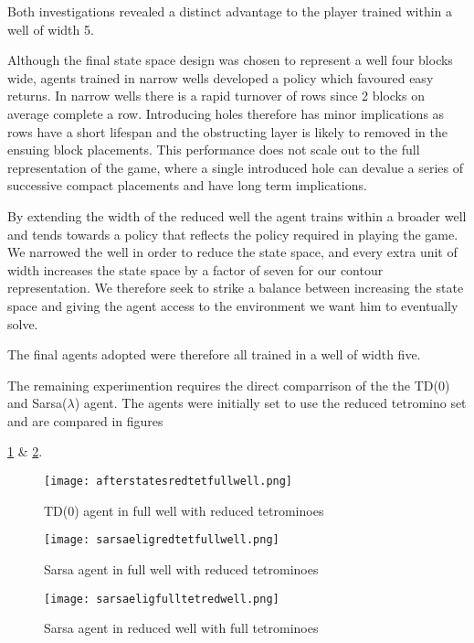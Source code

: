 \documentclass{rucsthesis}
\begin{document}
Both investigations revealed a distinct advantage to the player trained within a well of width 5.

Although the final state space design was chosen to represent a well four blocks wide, agents trained in narrow wells developed a policy which favoured easy returns. In narrow wells there is a rapid turnover of rows since 2 blocks on average complete a row. Introducing holes therefore has minor implications as rows have a short lifespan and the obstructing layer is likely to removed in the ensuing block placements. This performance does not scale out to the full representation of the game, where a single introduced hole can devalue a series of successive compact placements and have long term implications.

By extending the width of the reduced well the agent trains within a broader well and tends towards a policy that reflects the policy required in playing the game. We narrowed the well in order to reduce the state space, and every extra unit of width increases the state space by a factor of seven for our contour representation. We therefore seek to strike a balance between increasing the state space and giving the agent access to the environment we want him to eventually solve.

The final agents adopted were therefore all trained in a well of width five.

The remaining experimention requires the direct comparrison of the the TD(0) and Sarsa($\lambda$) agent. The agents were initially set to use the reduced tetromino set and are compared in figures

\ref{fig:afterstatesredtetfullwell} \& \ref{fig:sarsaeligredtetfullwell}.

\begin{figure}[h]
\centering
\texttt{[image: afterstatesredtetfullwell.png]}
\caption{TD(0) agent in full well with reduced tetrominoes}
\label{fig:afterstatesredtetfullwell}
\end{figure}

\begin{figure}[h]
\centering
\texttt{[image: sarsaeligredtetfullwell.png]}
\caption{Sarsa agent in full well with reduced tetrominoes}
\label{fig:sarsaeligredtetfullwell}
\end{figure}

\begin{figure}[h]
\centering
\texttt{[image: sarsaeligfulltetredwell.png]}
\caption{Sarsa agent in reduced well with full tetrominoes}
\label{fig:sarsaeligfulltetredwell}
\end{figure}
\end{document}
